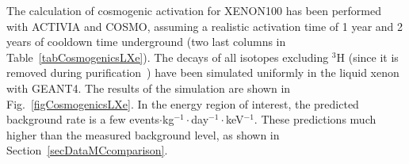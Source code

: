 The calculation of cosmogenic activation for XENON100 has been performed with ACTIVIA and COSMO, assuming a realistic activation time of 1 year and 2 years of cooldown time underground (two last columns in Table~\ref{tabCosmogenicsLXe}). The decays of all isotopes excluding $^{3}$H (since it is removed during purification~\cite{CosmogenicProduction_Mei}) have been simulated uniformly in the liquid xenon with GEANT4. The results of the simulation are shown in Fig.~\ref{figCosmogenicsLXe}. In the energy region of interest, the predicted background rate is a few events$\cdot$kg$^{-1}\cdot$day$^{-1}\cdot$keV$^{-1}$. These predictions much higher than the measured background level, as shown in Section~\ref{secDataMCcomparison}.

